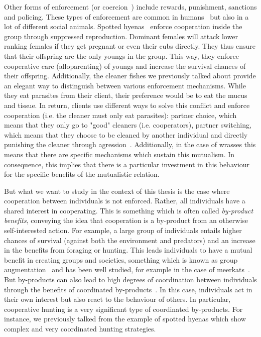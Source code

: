     Other forms of enforcement (or coercion~\parencite{Clutton-Brock2002}) include rewards, punishment, sanctions and policing. These types of enforcement are common in humans~\parencite{Fehr2002} but also in a lot of different social animals. Spotted hyenas~\parencite{Drea2003, Drea2009a, Smith2012a} enforce cooperation inside the group through suppressed reproduction. Dominant females will attack lower ranking females if they get pregnant or even their cubs directly. They thus ensure that their offspring are the only youngs in the group. This way, they enforce cooperative care (alloparenting) of youngs and increase the survival chances of their offspring. Additionally, the cleaner fishes we previously talked about provide an elegant way to distinguish between various enforcement mechanisms. While they eat parasites from their client, their preference would be to eat the mucus and tissue. In return, clients use different ways to solve this conflict and enforce cooperation (i.e. the cleaner must only eat parasites): partner choice, which means that they only go to "good" cleaners (i.e. cooperators), partner switching, which means that they choose to be cleaned by another individual and directly punishing the cleaner through agression~\parencite{Bshary2005}. Additionally, in the case of wrasses this means that there are specific mechanisms which sustain this mutualism. In consequence, this implies that there is a particular investment in this behaviour for the specific benefits of the mutualistic relation.


    But what we want to study in the context of this thesis is the case where cooperation between individuals is not enforced. Rather, all individuals have a shared interest in cooperating. This is something which is often called \emph{by-product benefits}, conveying the idea that cooperation is a by-product from an otherwise self-interested action. For example, a large group of individuals entails higher chances of survival (against both the environment and predators) and an increase in the benefits from foraging or hunting. This leads individuals to have a mutual benefit in creating groups and societies, something which is known as group augmentation~\parencite{Bergmuller2007a} and has been well studied, for example in the case of meerkats~\parencite{Clutton-Brock2002}. But by-products can also lead to high degrees of coordination between individuals through the benefits of coordinated by-products~\parencite{Leimar2003}. In this case, individuals act in their own interest but also react to the behaviour of others. In particular, cooperative hunting is a very significant type of coordinated by-products. For instance, we previously talked from the example of spotted hyenas which show complex and very coordinated hunting strategies.

